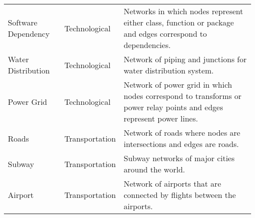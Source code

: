 \begin{longtable*}{| l | l | p{9cm} |}
      Software Dependency &  Technological & Networks in which nodes represent either class, function or package and edges correspond to dependencies.\\  %
      Water Distribution &  Technological & Network of piping and junctions for water distribution system.\\ %
      Power Grid &  Technological & Network of power grid in which nodes correspond to transforms or power relay points and edges represent power lines.\\ %
      Roads &  Transportation & Network of roads where nodes are intersections and edges are roads.\\ %
      Subway &  Transportation & Subway networks of major cities around the world.\\ %
      Airport &  Transportation & Network of airports that are connected by flights between the airports.\\  \hline
\end{longtable*}